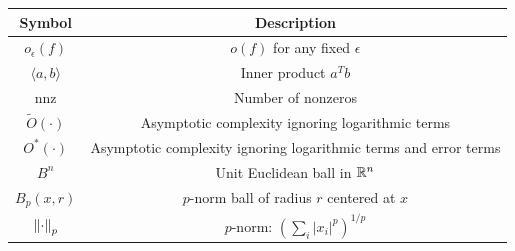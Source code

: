 \begin{center}
\begin{tabular}{|c|c|}
\hline 
Symbol & Description\tabularnewline
\hline 
\hline 
$o_{\epsilon}(f)$ & $o(f)$ for any fixed $\epsilon$\tabularnewline
\hline 
$\langle a,b\rangle$ & Inner product $a^{T}b$\tabularnewline
\hline 
nnz & Number of nonzeros\tabularnewline
\hline 
$\tilde{O}(\cdot)$ & Asymptotic complexity ignoring logarithmic terms\tabularnewline
\hline 
$O^{*}(\cdot)$ & Asymptotic complexity ignoring logarithmic terms and error terms\tabularnewline
\hline 
$B^{n}$ & Unit Euclidean ball in $\mathbb{R}^{n}$\tabularnewline
\hline 
$B_{p}(x,r)$ & $p$-norm ball of radius $r$ centered at $x$\tabularnewline
\hline 
$\left\Vert \cdot\right\Vert_{p}$ & $p$-norm: $\left(\sum_{i}\left|x_{i}\right|^{p}\right)^{1/p}$ \tabularnewline
\hline 
\end{tabular}
\par\end{center}
